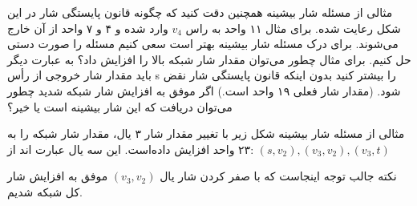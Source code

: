 \begin{itemframe}{مثالی از مسئله شار بیشینه}
\itm
همچنین دقت کنید که چگونه قانون پایستگی شار در این شکل رعایت شده. برای مثال ۱۱ واحد به راس
$v_4$
وارد شده و ۴ و ۷ واحد از آن خارج می‌شوند.
\itm
برای درک مسئله شار بیشینه بهتر است سعی کنیم مسئله را صورت دستی حل کنیم.
\itm
برای مثال چطور می‌توان مقدار شار شبکه بالا را افزایش داد؟ به عبارت دیگر باید مقدار شار خروجی از رأس s را بیشتر کنید بدون اینکه قانون پایستگی شار نقض شود. (مقدار شار فعلی ۱۹ واحد است.)
\itm
اگر موفق به افزایش شار شبکه شدید چطور می‌توان دریافت که این شار بیشینه است یا خیر؟

\end{itemframe}


\begin{itemframe}{مثالی از مسئله شار بیشینه}
\itm
شکل زیر با تغییر مقدار شار ۳ یال، مقدار شار شبکه را به ۲۳ واحد افزایش داده‌است. این سه یال عبارت اند از:
$(s, v_2), (v_3, v_2), (v_3, t)$

\itm
نکته جالب توجه اینجاست که با صفر کردن شار یال
$(v_3, v_2)$
موفق به افزایش شار کل شبکه شدیم.
\end{itemframe}